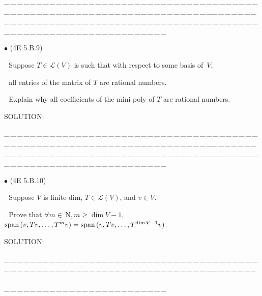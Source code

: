 \documentclass[a4paper, 11pt, UTF8]{article}
\def\Spn{\textup{span}\,}
\def\Lm{\mathcal{L}}
\def\Nbfc{$\,{\timesbf N}$}
\begin{document}
\begin{large}
\par
{\tiny \_\,\_\,\_\,\_\,\_\,\_\,\_\,\_\,\_\,\_\,\_\,\_\,\_\,\_\,\_\,\_\,\_\,\_\,\_\,\_\,\_\,\_\,\_\,\_\,\_\,\_\,\_\,\_\,\_\,\_\,\_\,\_\,\_\,\_\,\_\,\_\,\_\,\_\,\_\,\_\,\_\,\_\,\_\,\_\,\_\,\_\,\_\,\_\,\_\,\_\,\_\,\_\,\_\,\_\,\_\,\_\,\_\,\_\,\_\,\_\,\_\,\_\,\_\,\_\,\_\,\_\,\_\,\_\,\_\,\_\,\_\_\,\_\,\_\,\_\,\_\,\_\,\_\,\_\,\_\,\_\,\_\,\_\,\_\,\_\,\_\,\_\,\_\,\_\,\_\,\_\,\_\,\_\,\_\,\_\,\_\,\_\,\_\,\_\,\_\,\_\,\_\,\_\,\_\,\_\,\_\,\_\,\_\,\_\,\_\,\_\,\_\,\_\,\_\,\_\,\_\,\_\,\_\,\_\,\_\,\_\,\_\,\_\,\_\,\_\,\_\,\_\,\_\,\_\,\_\,\_\,\_\,\_\,\_\,\_\,\_\,\_\,\_\,\_\,\_\,\_\,\_}\par

{\small $\bullet$} (\normalsize{4E 5.B.9})\par\,\, {\timessl\Large 
Suppose $T\in\Lm(V)$ is such that with respect to some basis of \,$V$,}\par\,\,
{\timessl\Large all entries of the matrix of $T$ are rational numbers.}\par\,\,
{\timessl\Large Explain why all coefficients of the mini poly of $T$ are rational numbers.
}\par
{\timesbf S\footnotesize{OLUTION:}}\par\quad

\par
{\tiny \_\,\_\,\_\,\_\,\_\,\_\,\_\,\_\,\_\,\_\,\_\,\_\,\_\,\_\,\_\,\_\,\_\,\_\,\_\,\_\,\_\,\_\,\_\,\_\,\_\,\_\,\_\,\_\,\_\,\_\,\_\,\_\,\_\,\_\,\_\,\_\,\_\,\_\,\_\,\_\,\_\,\_\,\_\,\_\,\_\,\_\,\_\,\_\,\_\,\_\,\_\,\_\,\_\,\_\,\_\,\_\,\_\,\_\,\_\,\_\,\_\,\_\,\_\,\_\,\_\,\_\,\_\,\_\,\_\,\_\,\_\_\,\_\,\_\,\_\,\_\,\_\,\_\,\_\,\_\,\_\,\_\,\_\,\_\,\_\,\_\,\_\,\_\,\_\,\_\,\_\,\_\,\_\,\_\,\_\,\_\,\_\,\_\,\_\,\_\,\_\,\_\,\_\,\_\,\_\,\_\,\_\,\_\,\_\,\_\,\_\,\_\,\_\,\_\,\_\,\_\,\_\,\_\,\_\,\_\,\_\,\_\,\_\,\_\,\_\,\_\,\_\,\_\,\_\,\_\,\_\,\_\,\_\,\_\,\_\,\_\,\_\,\_\,\_\,\_\,\_\,\_}\par

{\small $\bullet$} (\normalsize{4E 5.B.10})\par\,\, {\timessl\Large 
Suppose $V$ is finite-dim, $T\in\Lm(V)$, and $v\in V$.}\par\,\,
{\timessl\Large Prove that $\forall m\in\Nbfc,m\geq \dim V - 1,$ $\Spn(v, Tv, \dots , T^m v) = \Spn(v, Tv, \dots , T^{\dim V-1} v)$.}\par
{\timesbf S\footnotesize{OLUTION:}}\par\quad

\par
{\tiny \_\,\_\,\_\,\_\,\_\,\_\,\_\,\_\,\_\,\_\,\_\,\_\,\_\,\_\,\_\,\_\,\_\,\_\,\_\,\_\,\_\,\_\,\_\,\_\,\_\,\_\,\_\,\_\,\_\,\_\,\_\,\_\,\_\,\_\,\_\,\_\,\_\,\_\,\_\,\_\,\_\,\_\,\_\,\_\,\_\,\_\,\_\,\_\,\_\,\_\,\_\,\_\,\_\,\_\,\_\,\_\,\_\,\_\,\_\,\_\,\_\,\_\,\_\,\_\,\_\,\_\,\_\,\_\,\_\,\_\,\_\_\,\_\,\_\,\_\,\_\,\_\,\_\,\_\,\_\,\_\,\_\,\_\,\_\,\_\,\_\,\_\,\_\,\_\,\_\,\_\,\_\,\_\,\_\,\_\,\_\,\_\,\_\,\_\,\_\,\_\,\_\,\_\,\_\,\_\,\_\,\_\,\_\,\_\,\_\,\_\,\_\,\_\,\_\,\_\,\_\,\_\,\_\,\_\,\_\,\_\,\_\,\_\,\_\,\_\,\_\,\_\,\_\,\_\,\_\,\_\,\_\,\_\,\_\,\_\,\_\,\_\,\_\,\_\,\_\,\_\,\_}\par


\end{large}
\end{document}
